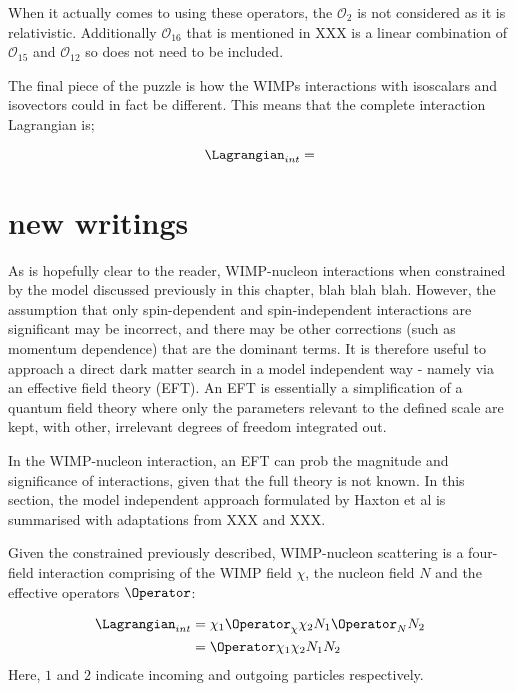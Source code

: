 \par
When it actually comes to using these operators, the $\mathcal{O}_{2}$ is not considered as it is relativistic. 
Additionally $\mathcal{O}_{16}$ that is mentioned in XXX is a linear combination of $\mathcal{O}_{15}$ and $\mathcal{O}_{12}$ so does not need to be included.

\par
The final piece of the puzzle is how the WIMPs interactions with isoscalars and isovectors could in fact be different.
This means that the complete interaction Lagrangian is;

\begin{equation}
    \Lagrangian_{int} = 
    \label{eq:HENR_Interaction_Lagrangian}
\end{equation}

\section{new writings}
\par
As is hopefully clear to the reader, WIMP-nucleon interactions when constrained by the model discussed previously in this chapter, blah blah blah.
However, the assumption that only spin-dependent and spin-independent interactions are significant may be incorrect, and there may be other corrections (such as momentum dependence) that are the dominant terms.
It is therefore useful to approach a direct dark matter search in a model independent way - namely via an effective field theory (EFT).
An EFT is essentially a simplification of a quantum field theory where only the parameters relevant to the defined scale are kept, with other, irrelevant degrees of freedom integrated out.

\par
In the WIMP-nucleon interaction, an EFT can prob the magnitude and significance of interactions, given that the full theory is not known.
In this section, the model independent approach formulated by Haxton et al is summarised with adaptations from XXX and XXX.

\par
Given the constrained previously described, WIMP-nucleon scattering is a four-field interaction comprising of the WIMP field $\chi$, the nucleon field $N$ and the effective operators $\Operator$:

\begin{align}
\begin{split}
    \Lagrangian_{int} &= \chi_{1} \Operator_{\chi} \chi_{2} N_{1} \Operator_{N} N_{2} \\
                      &= \Operator \chi_{1}\chi_{2} N_{1}N_{2}
\end{split}
\end{align}
Here, $1$ and $2$ indicate incoming and outgoing particles respectively.


